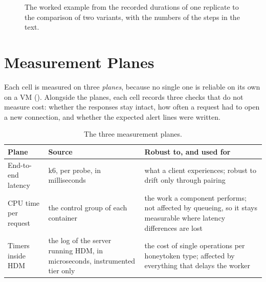 \documentclass{rptuma}
\begin{document}
\begin{figure}[!t]
\caption[The worked example, from the recorded durations to the comparison of two variants.]{The worked example from the recorded durations of one replicate to the comparison of two variants, with the numbers of the steps in the text.}
\label{fig:method.example}
\end{figure}


\section{Measurement Planes}
\label{sec:method.planes}

Each cell is measured on three \emph{planes}, because no single one is reliable on its own on a
VM (). Alongside the planes, each cell records three checks that do not
measure cost: whether the responses stay intact, how often a request had to open a new connection,
and whether the expected alert lines were written.

\begin{table}[htbp]
\centering
\small
\begin{tabularx}{\textwidth}{@{}>{\raggedright\arraybackslash}p{2.6cm}>{\raggedright\arraybackslash}p{3.8cm}>{\raggedright\arraybackslash}X@{}}
\toprule
Plane & Source & Robust to, and used for \\
\midrule
End-to-end latency & k6, per probe, in milliseconds & what a client experiences; robust to drift
  only through pairing \\ \addlinespace
CPU time per request & the control group of each container & the work a component performs; not
  affected by queueing, so it stays measurable where latency differences are lost \\ \addlinespace
Timers inside HDM & the log of the server running HDM, in microseconds, instrumented tier only & the cost of
  single operations per honeytoken type; affected by everything that delays the worker \\
\bottomrule
\end{tabularx}
\caption{The three measurement planes.}
\label{tab:method.planes}
\end{table}
\end{document}
